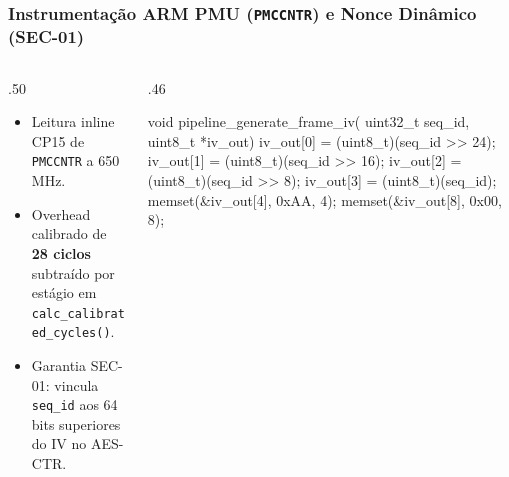 \begin{frame}[fragile]
  \frametitle{Instrumenta\c{c}\~ao ARM PMU (\texttt{PMCCNTR}) e Nonce Din\^amico (SEC-01)}
  \begin{columns}[T]
    \begin{column}{.50\textwidth}
      \begin{pontoschave}
        \begin{itemize}
          \item Leitura inline CP15 de \texttt{PMCCNTR} a 650 MHz.
          \item Overhead calibrado de \textbf{28 ciclos} subtra\'ido por est\'agio em \texttt{calc\_calibrated\_cycles()}.
          \item Garantia SEC-01: vincula \texttt{seq\_id} aos 64 bits superiores do IV no AES-CTR.
        \end{itemize}
      \end{pontoschave}
    \end{column}
    \begin{column}{.46\textwidth}
      \begin{ccode}
void pipeline_generate_frame_iv(
    uint32_t seq_id, uint8_t *iv_out) {
  iv_out[0] = (uint8_t)(seq_id >> 24);
  iv_out[1] = (uint8_t)(seq_id >> 16);
  iv_out[2] = (uint8_t)(seq_id >> 8);
  iv_out[3] = (uint8_t)(seq_id);
  memset(&iv_out[4], 0xAA, 4);
  memset(&iv_out[8], 0x00, 8);
}
      \end{ccode}
    \end{column}
  \end{columns}
\end{frame}
